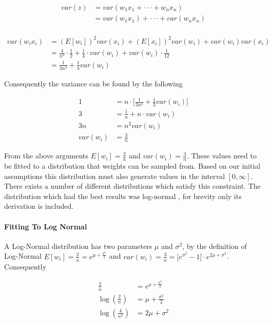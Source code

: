 \begin{align*}
var(z) &= var(w_1x_1 + \cdot \cdot \cdot + w_nx_n)\\
&= var(w_1x_1) + \cdot \cdot \cdot + car(w_nx_n)\\
\end{align*}

\begin{align*}
var(w_ix_i) &= (E[w_i])^2var(x_i) + (E[x_i])^2var(w_i) + var(w_i)var(x_i)\\
&= \frac{4}{n^2} \cdot \frac{1}{2} + \frac{1}{4} \cdot var(w_i) + var(w_i) \cdot \frac{1}{12}\\
&= \frac{1}{3 n^2} + \frac{1}{3}var(w_i)
\end{align*}

Consequently the variance can be found by the following

\begin{align*}
1 &= n \cdot \big[\frac{1}{3 n^2} + \frac{1}{3}var(w_i)\big]\\
3 &= \frac{1}{n} + n \cdot var(w_i)\\
3n &= n^2 var(w_i)\\
var(w_i) &= \frac{3}{n}
\end{align*}

From the above arguments $E[w_i] = \frac{2}{n}$ and $var(w_i) = \frac{3}{n}$. These values need to be fitted to a distribution that weights can be sampled from. Based on our initial assumptions this distribution must also generate values in the interval $[0, \infty]$. There exists a number of different distributions which satisfy this constraint. The distribution which had the best results was log-normal \cite{balakrishnan2006continuous}, for brevity only its derivation is included.

\paragraph{Fitting To Log Normal}

A Log-Normal distribution has two parameters $\mu$ and $\sigma^2$, by the definition of Log-Normal $E[w_i] = \frac{2}{n} = e^{\mu + \frac{\sigma^2}{2}}$ and $var(w_i) = \frac{3}{n} = \big[e^{\sigma^2} - 1\big] \cdot e^{2\mu + \sigma^2}$. Consequently

\begin{align*}
\frac{2}{n} &= e^{\mu + \frac{\sigma^2}{2}}\\
\log(\frac{2}{n}) &= \mu + \frac{\sigma^2}{2}\\
\log(\frac{4}{n^2}) &= 2\mu + \sigma^2
\end{align*}

